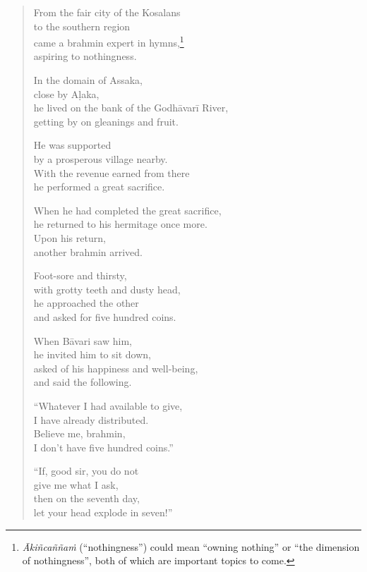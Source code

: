 \documentclass[12pt,openany]{book}%
\begin{document}
\begin{verse}%
From the fair city of the Kosalans \\
to the southern region \\
came a brahmin expert in hymns,\footnote{\textit{\textsanskrit{Ākiñcaññaṁ}} (“nothingness”) could mean “owning nothing” or “the dimension of nothingness”, both of which are important topics to come. } \\
aspiring to nothingness. 

In the domain of Assaka, \\
close by \textsanskrit{Aḷaka}, \\
he lived on the bank of the \textsanskrit{Godhāvarī} River, \\
getting by on gleanings and fruit. 

He was supported \\
by a prosperous village nearby. \\
With the revenue earned from there \\
he performed a great sacrifice. 

When he had completed the great sacrifice, \\
he returned to his hermitage once more. \\
Upon his return, \\
another brahmin arrived. 

Foot-sore and thirsty, \\
with grotty teeth and dusty head, \\
he approached the other \\
and asked for five hundred coins. 

When \textsanskrit{Bāvari} saw him, \\
he invited him to sit down, \\
asked of his happiness and well-being, \\
and said the following. 

“Whatever I had available to give, \\
I have already distributed. \\
Believe me, brahmin, \\
I don’t have five hundred coins.” 

“If, good sir, you do not \\
give me what I ask, \\
then on the seventh day, \\
let your head explode in seven!” 


\end{verse}
\end{document}
